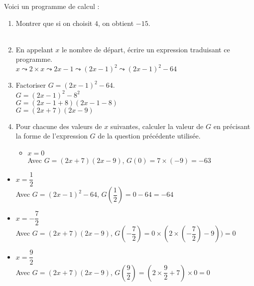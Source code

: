 \begin{corrige}
    Voici un programme de calcul :
    \begin{enumerate}
        \item Montrer que si on choisit $4$, on obtient $-15$.\\        
        \hspace*{-5mm}{\red $4 \leadsto 2\times 4=8 \leadsto 8-1=7 \leadsto 7^2=49 \leadsto 49-64=-15$}\\
        \item En appelant $x$ le nombre de départ, écrire un expression traduisant ce programme.\\
        {\red $x \leadsto 2\times x \leadsto 2x-1 \leadsto (2x-1)^2 \leadsto (2x-1)^2-64$}\\
        \item Factoriser $G = (2x-1)^2-64$.\\
        {\red $G=(2x-1)^2 - 8^2$\\$G=(2x-1+8)(2x-1-8)$\\$G=(2x+7)(2x-9)$}\\
        \item Pour chacune des valeurs de $x$ suivantes, calculer la valeur de $G$ en précisant la forme de l'expression $G$ de la question précédente utilisée.
        \begin{itemize}
            \item $x=0$\\
            {\red Avec $G=(2x+7)(2x-9)$, $G(0)=7\times (-9)=-63$}\\
        \end{itemize}
    \end{enumerate}
    \Coupe
    \begin{enumerate}        
        \begin{itemize}
            \item $x=\dfrac12$\\
            {\red Avec $G=(2x-1)^2-64$, $G(\dfrac12)=0-64=-64$}\\
            \item $x=-\dfrac72$\\
            {\red Avec $G=(2x+7)(2x-9)$, $G(-\dfrac72)=0\times (2\times(-\dfrac72) -9))=0$}\\
            \item $x=\dfrac92$\\
            {\red Avec $G=(2x+7)(2x-9)$, $G(\dfrac92)=(2\times \dfrac92 + 7)\times 0=0$}\\            
        \end{itemize}
    \end{enumerate}
    \vspace*{-20mm}
\end{corrige}

